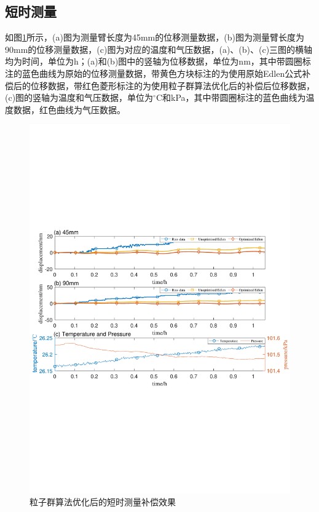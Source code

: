 \subsection{短时测量}
如图\ref{fig:粒子群算法优化后的短时测量补偿效果}所示，(a)图为测量臂长度为45mm的位移测量数据，(b)图为测量臂长度为90mm的位移测量数据，(c)图为对应的温度和气压数据，(a)、(b)、(c)三图的横轴均为时间，单位为h；(a)和(b)图中的竖轴为位移数据，单位为nm，其中带圆圈标注的蓝色曲线为原始的位移测量数据，带黄色方块标注的为使用原始Edlen公式补偿后的位移数据，带红色菱形标注的为使用粒子群算法优化后的补偿后位移数据，(c)图的竖轴为温度和气压数据，单位为$^{\circ} \mathrm{C}$和kPa，其中带圆圈标注的蓝色曲线为温度数据，红色曲线为气压数据。
\begin{figure}[htb]
    \centering
    \includegraphics[width=14cm]{fig/4-fig/edpso_短时测量实验数据.pdf}
    \caption{粒子群算法优化后的短时测量补偿效果}
    \label{fig:粒子群算法优化后的短时测量补偿效果}
\end{figure}

